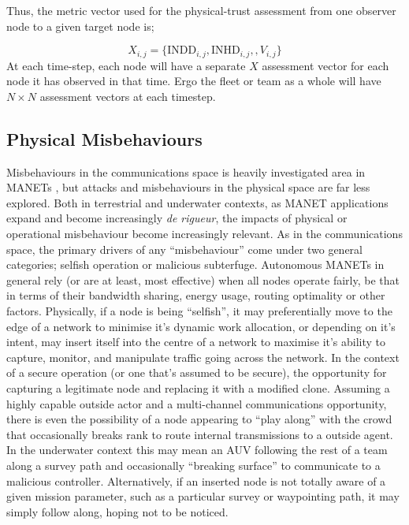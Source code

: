\documentclass[conference]{IEEEtran}
\begin{document}
Thus, the metric vector used for the physical-trust assessment from one observer node to a given target node is;

\begin{equation}
  X_{i,j}=\{\text{INDD}_{i,j}, \text{INHD}_{i,j},, V_{i,j}\}
  \label{eq:phys_vector}
\end{equation}
At each time-step, each node will have a separate $X$ assessment vector for each node it has observed in that time. 
Ergo the fleet or team as a whole will have $N\times N$ assessment vectors at each timestep.

\subsection{Physical Misbehaviours}
Misbehaviours in the communications space is heavily investigated area in MANETs \cite{Konate2011}\cite{Wang2009}\cite{Chen2014a}\cite{Mitchell2014}, but attacks and misbehaviours in the physical space are far less explored. 
Both in terrestrial and underwater contexts, as MANET applications expand and become increasingly \emph{de rigueur}, the impacts of physical or operational misbehaviour become increasingly relevant. 
As in the communications space, the primary drivers of any ``misbehaviour'' come under two general categories; selfish operation or malicious subterfuge.
Autonomous MANETs in general rely (or are at least, most effective) when all nodes operate fairly, be that in terms of their bandwidth sharing, energy usage, routing optimality or other factors. 
Physically, if a node is being ``selfish'', it may preferentially move to the edge of a network to minimise it's dynamic work allocation, or depending on it's intent, may insert itself into the centre of a network to maximise it's ability to capture, monitor, and manipulate traffic going across the network. 
In the context of a secure operation (or one that's assumed to be secure), the opportunity for capturing a legitimate node and replacing it with a modified clone.
Assuming a highly capable outside actor and a multi-channel communications opportunity, there is even the possibility of a node appearing to ``play along'' with the crowd that occasionally breaks rank to route internal transmissions to a outside agent.
In the underwater context this may mean an AUV following the rest of a team along a survey path and occasionally ``breaking surface'' to communicate to a malicious controller.
Alternatively, if an inserted node is not totally aware of a given mission parameter, such as a particular survey or waypointing path, it may simply follow along, hoping not to be noticed.
\end{document}
